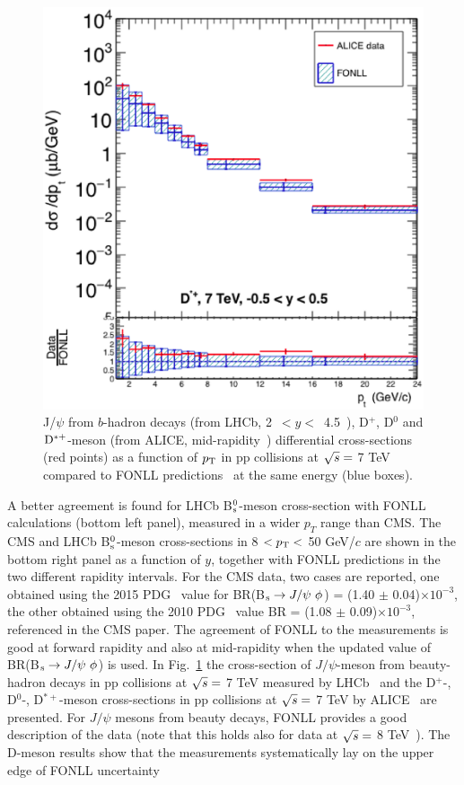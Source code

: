 \begin{figure}[!htbp]
\begin{center}
\includegraphics[width=.45\textwidth]{FigCap4/Dstar_7TeV_y_05_05.eps}
\caption{J/$\psi$ from $b$-hadron decays (from LHCb, \mbox{2 $< y <$ 4.5}~\cite{Aaij:2011jh}), D$^{+}$, D$^{0}$ and ${\rm D^{*+}}$-meson (from ALICE, mid-rapidity~\cite{ALICE:2011aa}) differential cross-sections (red points) as a function of $p_{\rm T}$ in pp collisions at $\sqrt{s} = $ 7 TeV compared to FONLL predictions~\cite{Cacciari:1998it, Cacciari:2001td} at the same energy (blue boxes). }
\label{fig:Dmesons}
\end{center}
\end{figure}
A better agreement is found for 
LHCb B$^0_{\rm s}$-meson cross-section with FONLL calculations (bottom left panel), measured in a wider 
$p_{T}$ range than CMS. The CMS and LHCb B$^0_{\rm s}$-meson cross-sections in 
8 $< p_{\rm T} <$ 50 GeV/$c$ are shown in 
the bottom right panel as a function of $y$, together with FONLL predictions in the 
two different rapidity intervals. For the CMS data, two cases are 
reported, one obtained using the 2015 PDG~\cite{Agashe:2014kda} value for 
BR(B$_{\rm s} \rightarrow J/{\rm \psi} ~\phi$) = (1.40 $\pm$ 0.04)$\times 10^{-3}$,
the other obtained using the 2010 PDG~\cite{Nakamura:2010zzi} value BR = (1.08 $\pm$ 0.09)$\times 10^{-3}$, 
referenced in the CMS paper. The agreement of FONLL to the measurements is good
at forward rapidity and also at mid-rapidity when the updated value of BR(B$_{\rm s} \rightarrow J/{\rm \psi} ~\phi$) is used.
In Fig.~\ref{fig:Dmesons} the cross-section 
of $J/\psi$-meson from beauty-hadron decays in pp collisions at 
$\sqrt{s} = $ 7 TeV measured by LHCb~\cite{Aaij:2011jh} and 
the D$^{+}$-, D$^{0}$-, D$^{*+}$-meson cross-sections in pp collisions at $\sqrt{s} = $ 7 TeV by ALICE~\cite{ALICE:2011aa}
are presented. For $J/\psi$ mesons from beauty decays, FONLL provides a good description of 
the data (note that this holds also for data at $\sqrt{s} =$ 8 TeV~\cite{Aaij:2013yaa}). 
The D-meson results show that the measurements 
systematically lay on the upper edge of FONLL uncertainty 
